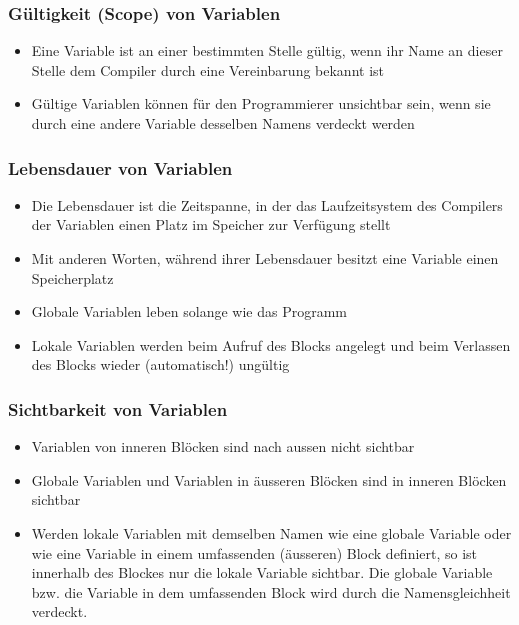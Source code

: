 \subsubsection{Gültigkeit (Scope) von Variablen\hfill}
\label{sec:unterunterabschnitt}
\begin{itemize}
	\item Eine Variable ist an einer bestimmten Stelle gültig, wenn ihr Name an dieser Stelle dem Compiler durch eine Vereinbarung bekannt ist
	\item Gültige Variablen können für den Programmierer unsichtbar sein, wenn sie durch eine andere Variable desselben Namens verdeckt werden
\end{itemize}

\subsubsection{Lebensdauer von Variablen\hfill}
\label{sec:unterunterabschnitt}
\begin{itemize}
	\item Die Lebensdauer ist die Zeitspanne, in der das Laufzeitsystem des Compilers der Variablen einen Platz im Speicher zur Verfügung stellt
	\item Mit anderen Worten, während ihrer Lebensdauer besitzt eine Variable einen Speicherplatz
	\item Globale Variablen leben solange wie das Programm
	\item Lokale Variablen werden beim Aufruf des Blocks angelegt und beim Verlassen des Blocks wieder (automatisch!) ungültig
\end{itemize}

\subsubsection{Sichtbarkeit von Variablen\hfill}
\label{sec:unterunterabschnitt}
\begin{itemize}
	\item Variablen von inneren Blöcken sind nach aussen nicht sichtbar
	\item Globale Variablen und Variablen in äusseren Blöcken sind in inneren Blöcken sichtbar
	\item Werden lokale Variablen mit demselben Namen wie eine globale Variable oder wie eine Variable in einem umfassenden (äusseren) Block definiert, so ist innerhalb des Blockes nur die lokale Variable sichtbar. Die globale Variable bzw. die Variable in dem umfassenden Block wird durch die Namensgleichheit verdeckt.
\end{itemize}

